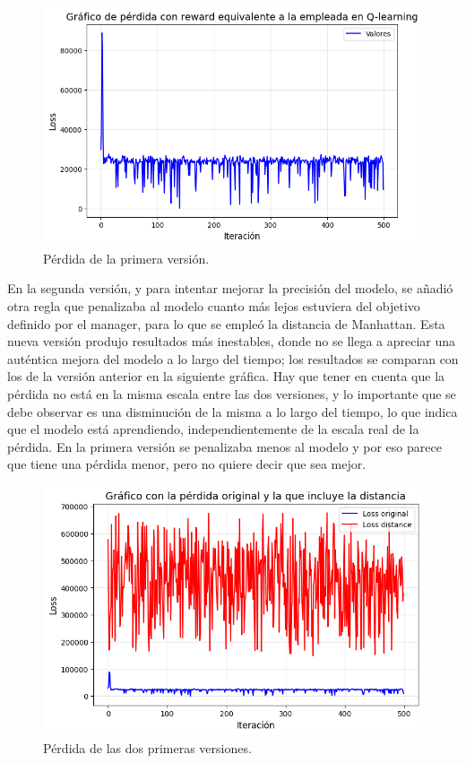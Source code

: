 \documentclass[letterpaper]{article} %
\begin{document}
\begin{figure}[H]
    \centering
    \includegraphics[width=0.9\columnwidth]{FuN_1.png}
    \caption{Pérdida de la primera versión.\label{fig:FuN6}}
\end{figure}

En la segunda versión, y para intentar mejorar la precisión del modelo, se añadió otra regla que penalizaba al modelo cuanto más lejos estuviera del objetivo definido por el manager, para lo que se empleó la distancia de Manhattan. Esta nueva versión 
produjo resultados más inestables, donde no se llega a apreciar una auténtica mejora del modelo a lo largo del tiempo; los resultados se comparan con los de la versión anterior en la siguiente gráfica. Hay que tener en cuenta que la pérdida no está
en la misma escala entre las dos versiones, y lo importante que se debe observar es una disminución de la misma a lo largo del tiempo, lo que indica que el modelo está aprendiendo, independientemente de la escala real de la pérdida. En la primera versión se 
penalizaba menos al modelo y por eso parece que tiene una pérdida menor, pero no quiere decir que sea mejor.

\begin{figure}[H]
    \centering
    \includegraphics[width=0.9\columnwidth]{FuN_2.png}
    \caption{Pérdida de las dos primeras versiones.\label{fig:FuN4}}
\end{figure}
\end{document}
